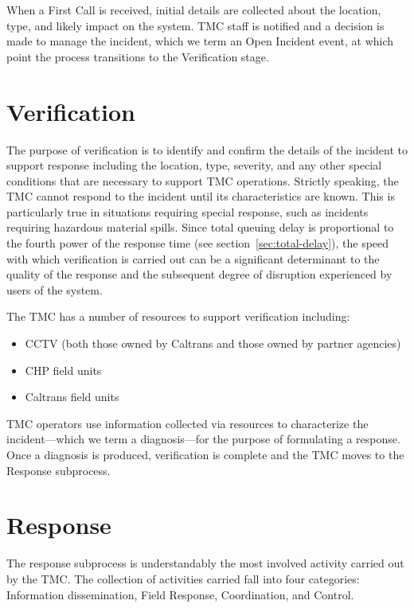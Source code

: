 \documentclass[12pt]{report}
\newcounter{time}
\begin{document}
When a {\sc First Call} is received, initial details are collected about the
location, type, and likely impact on the system.  \ac{TMC} staff is notified and a
decision is made to manage the incident, which we term an {\sc Open Incident}
event, at which point the process transitions to the Verification stage.


\section{Verification}
\label{sec:verification}

The purpose of verification is to identify and confirm the details of the
incident to support response including the location, type, severity, and any
other special conditions that are necessary to support \ac{TMC} operations.  Strictly
speaking, the \ac{TMC} cannot respond to the incident until its characteristics are
known.  This is particularly true in situations requiring special response, such
as incidents requiring hazardous material spills.  Since total queuing delay is
proportional to the fourth power of the response time (see
section~\ref{sec:total-delay}), the speed with which verification is carried out
can be a significant determinant to the quality of the response and the
subsequent degree of disruption experienced by users of the system.

The \ac{TMC} has a number of resources to support verification including:
\begin{itemize}
\item CCTV (both those owned by Caltrans and those owned by partner
  agencies)
\item \ac{CHP} field units
\item Caltrans field units
\end{itemize}
\ac{TMC} operators use information collected via resources to characterize the
incident---which we term a diagnosis---for the purpose of formulating a
response.  Once a diagnosis is produced, verification is complete and the \ac{TMC}
moves to the {\sc Response} subprocess.

\section{Response}
\label{sec:response}

The response subprocess is understandably the most involved activity carried out
by the \ac{TMC}.  The collection of activities carried fall into four categories:
Information dissemination, Field Response, Coordination, and Control.
\end{document}

